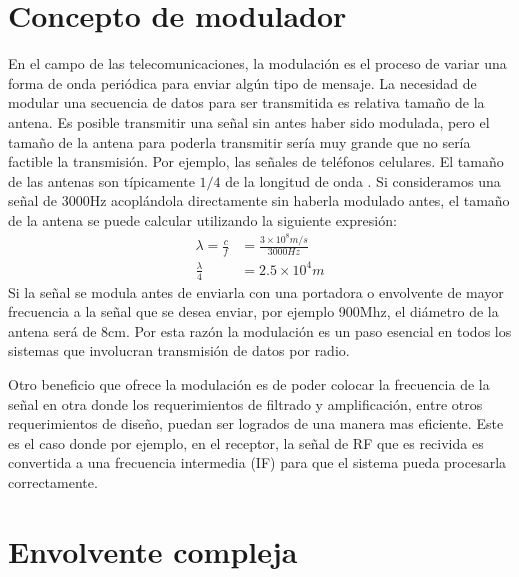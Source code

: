 \section{Concepto de modulador}

En el campo de las telecomunicaciones, la modulaci\'on es el proceso de variar
una forma de onda peri\'odica para enviar alg\'un tipo de mensaje. La necesidad
de modular una secuencia de datos para ser transmitida es relativa tama\~no de
la antena. Es posible transmitir una se\~nal sin antes haber sido modulada, pero
el tama\~no de la antena para poderla transmitir ser\'ia muy grande que no
ser\'ia factible la transmisi\'on. Por ejemplo, las se\~nales de tel\'efonos
celulares. El tama\~no de las antenas son t\'ipicamente $1/4$ de la longitud de onda
\cite{sklar}. Si consideramos una se\~nal de 3000Hz acopl\'andola directamente
sin haberla modulado antes, el tama\~no de la antena se puede calcular
utilizando la siguiente expresi\'on:
\begin{equation}
\begin{aligned}
\lambda=\frac{c}{f}&=\frac{3\times10^8m/s}{3000Hz}\\
\frac{\lambda}{4}&=2.5\times10^4m
\end{aligned}
\end{equation}
Si la se\~nal se modula antes de enviarla con una portadora o envolvente de
mayor frecuencia a la se\~nal que se desea enviar, por ejemplo 900Mhz, el
di\'ametro de la antena ser\'a de 8cm. Por esta raz\'on la modulaci\'on es un
paso esencial en todos los sistemas que involucran transmisi\'on de datos por
radio.

Otro beneficio que ofrece la modulaci\'on es de poder colocar la frecuencia de la se\~nal en otra
donde los requerimientos de filtrado y amplificaci\'on, entre otros requerimientos de dise\~no,
puedan ser logrados de una manera mas eficiente. Este es el caso donde por ejemplo, en el receptor,
la se\~nal de RF que es recivida es convertida a una frecuencia intermedia (IF) para que el sistema
pueda procesarla correctamente.

\section{Envolvente compleja}

